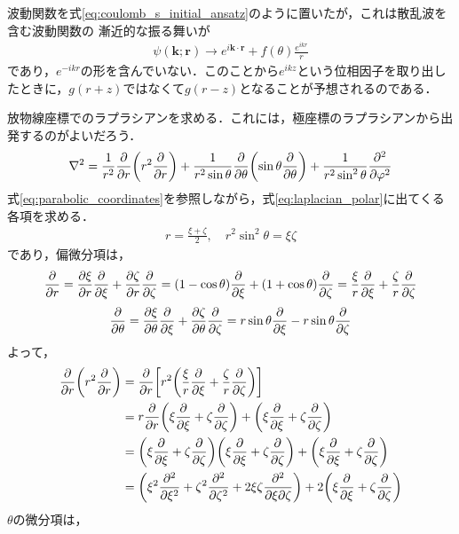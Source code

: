 \documentclass[a4paper,11pt]{ltjsarticle}
\begin{document}
波動関数を式\ref{eq:coulomb_s_initial_ansatz}のように置いたが，これは散乱波を含む波動関数の
漸近的な振る舞いが
\begin{align}\label{eq:asymptotic_form}
  \psi(\bm{k};\bm{r}) \rightarrow e^{i \bm{k} \cdot \bm{r}} + f(\theta) \frac{e^{ikr}}{r}
\end{align}
であり，$e^{-ikr}$の形を含んでいない．このことから$e^{ikz}$という位相因子を取り出したときに，$g(r+z)$ではなくて$g(r-z)$となることが予想されるのである．


放物線座標でのラプラシアンを求める．これには，極座標のラプラシアンから出発するのがよいだろう．
\begin{align}\label{eq:laplacian_polar}
  \nabla^2 = \frac{1}{r^2} \pdv{r}\qty(r^2\pdv{r}) + \frac{1}{r^2 \sin \theta} 
  \pdv{\theta}\qty(\sin \theta \pdv{\theta}) + \frac{1}{r^2 \sin^2 \theta} \pdv[2]{\varphi}
\end{align}
式\ref{eq:parabolic_coordinates}を参照しながら，式\ref{eq:laplacian_polar}に出てくる各項を求める．
\begin{align*}
  r = \frac{\xi + \zeta}{2}, \quad r^2\sin^2\theta = \xi \zeta
\end{align*}
であり，偏微分項は，
\begin{align*}
  \pdv{r} = \pdv{\xi}{r} \pdv{\xi} + \pdv{\zeta}{r} \pdv{\zeta} = \qty(1- \cos \theta) \pdv{\xi} + \qty(1 + \cos \theta) \pdv{\zeta}
  = \frac{\xi}{r} \pdv{\xi} + \frac{\zeta}{r} \pdv{\zeta}
\end{align*}
\begin{align*}
  \pdv{\theta} = \pdv{\xi}{\theta} \pdv{\xi} + \pdv{\zeta}{\theta} \pdv{\zeta} = r \sin \theta \pdv{\xi} - r  \sin \theta \pdv{\zeta}
\end{align*}
よって，
\begin{align*}
  \pdv{r}\qty(r^2\pdv{r}) 
  &=  \pdv{r} \qty[r^2\qty( \frac{\xi}{r} \pdv{\xi} + \frac{\zeta}{r} \pdv{\zeta})] \\
  &=  r \pdv{r} \qty(\xi \pdv{\xi} + \zeta \pdv{\zeta}) + \qty(\xi \pdv{\xi} + \zeta \pdv{\zeta}) \\
  &= \qty(\xi \pdv{\xi} + \zeta \pdv{\zeta})\qty(\xi \pdv{\xi} + \zeta \pdv{\zeta}) + \qty(\xi \pdv{\xi} + \zeta \pdv{\zeta}) \\
  &= \qty(\xi^2 \pdv[2]{\xi} + \zeta^2 \pdv[2]{\zeta} + 2\xi\zeta \pdv{}{\xi}{\zeta}) + 2\qty(\xi \pdv{\xi} + \zeta \pdv{\zeta}) \\
\end{align*}
$\theta$の微分項は，
\end{document}
